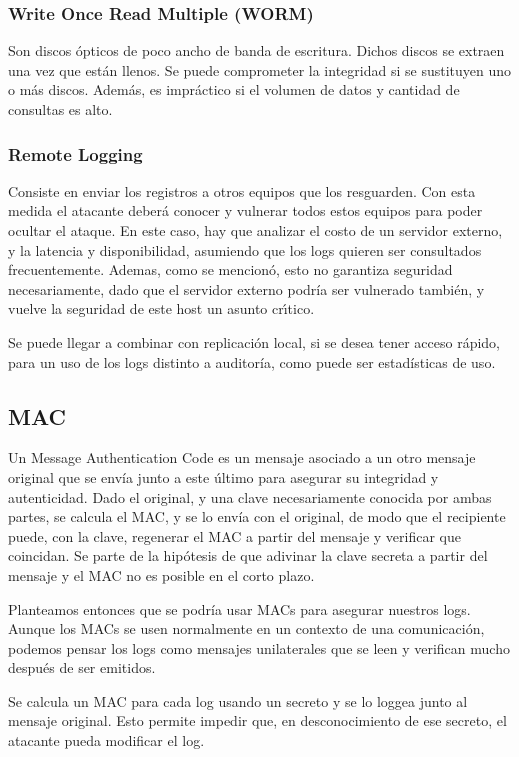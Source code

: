 \subsubsection{Write Once Read Multiple (WORM)}
Son discos ópticos de poco ancho de banda de escritura. Dichos discos se extraen una vez que
están llenos. Se puede comprometer la integridad si se sustituyen uno o más discos. Además, es impráctico si el volumen de datos y cantidad de consultas es alto.

\subsubsection{Remote Logging}
Consiste en enviar los registros a otros equipos que los resguarden. Con esta medida el atacante deberá conocer y vulnerar todos estos equipos para poder ocultar el ataque. En este caso, hay que analizar el costo de un servidor externo, y la latencia y disponibilidad, asumiendo que los logs quieren ser consultados frecuentemente. Ademas, como se mencionó, esto no garantiza seguridad necesariamente, dado que el servidor externo podría ser vulnerado también, y vuelve la seguridad de este host un asunto crı́tico.

Se puede llegar a combinar con replicación local, si se desea tener acceso rápido, para un uso de los logs distinto a auditoría, como puede ser estadísticas de uso.


\subsection{MAC}
Un Message Authentication Code es un mensaje asociado a un otro mensaje original que se envía junto a este último para asegurar su integridad y autenticidad. Dado el original, y una clave necesariamente conocida por ambas partes, se calcula el MAC, y se lo envía con el original, de modo que el recipiente puede, con la clave, regenerar el MAC a partir del mensaje y verificar que coincidan.	Se parte de la hipótesis de que adivinar la clave secreta a partir del mensaje y el MAC no es posible en el corto plazo.

Planteamos entonces que se podría usar MACs para asegurar nuestros logs. Aunque los MACs se usen normalmente en un contexto de una comunicación, podemos pensar los logs como mensajes unilaterales que se leen y verifican mucho después de ser emitidos.

Se calcula un MAC para cada log usando un secreto y se lo loggea junto al mensaje original. Esto permite impedir que, en desconocimiento de ese secreto, el atacante pueda modificar el log.

